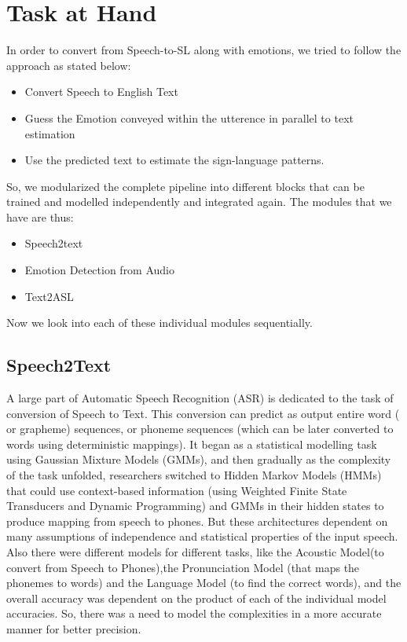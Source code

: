 \documentclass[14pt,a4paper]{article}
\begin{document}
\section{Task at Hand}
In order to convert from Speech-to-SL along with emotions, we tried to follow the approach as stated below:
\begin{itemize}
	\item Convert Speech to English Text
	\item Guess the Emotion conveyed within the utterence in parallel to text estimation
	\item Use the predicted text to estimate the sign-language patterns.
\end{itemize}
So, we modularized the complete pipeline into different blocks that can be trained and modelled independently and integrated again. The modules that we have are thus:
\begin{itemize}
	\item Speech2text
	\item Emotion Detection from Audio
	\item Text2ASL
\end{itemize}
Now we look into each of these individual modules sequentially. 

\subsection{Speech2Text}
A large part of Automatic Speech Recognition (ASR) is dedicated to the task of conversion of Speech to Text. This conversion can predict as output entire word ( or grapheme) sequences, or phoneme sequences (which can be later converted to words using deterministic mappings). It began as a statistical modelling task using Gaussian Mixture Models (GMMs), and then gradually as the complexity of the task unfolded, researchers switched to Hidden Markov Models (HMMs) that could use context-based information (using Weighted Finite State Transducers and Dynamic Programming) and GMMs in their hidden states to produce mapping from speech to phones. But these architectures dependent on many assumptions of independence and statistical properties of the input speech. Also there were different models for different tasks, like the Acoustic Model(to convert from Speech to Phones),the Pronunciation Model (that maps the phonemes to words) and the Language Model (to find the correct words), and the overall accuracy was dependent on the product of each of the individual model accuracies. So, there was a need to model the complexities in a more accurate manner for better precision.
\end{document}
